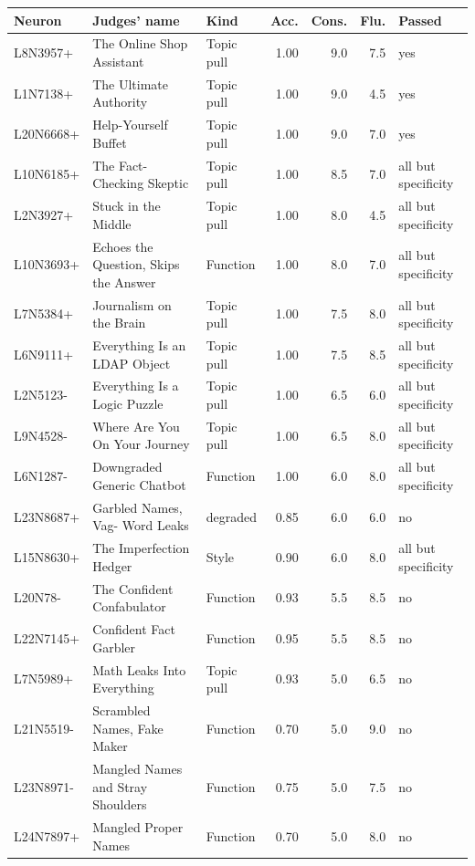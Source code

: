 {\scriptsize\begin{longtable}{@{}lL{3.4cm}L{1.8cm}rrrL{2.2cm}@{}}
\toprule Neuron & Judges' name & Kind & Acc. & Cons. & Flu. & Passed \\ \midrule \endhead
\bottomrule \endfoot
L8N3957+ & The Online Shop Assistant & Topic pull & 1.00 & 9.0 & 7.5 & yes \\
L1N7138+ & The Ultimate Authority & Topic pull & 1.00 & 9.0 & 4.5 & yes \\
L20N6668+ & Help-Yourself Buffet & Topic pull & 1.00 & 9.0 & 7.0 & yes \\
L10N6185+ & The Fact-Checking Skeptic & Topic pull & 1.00 & 8.5 & 7.0 & all but specificity \\
L2N3927+ & Stuck in the Middle & Topic pull & 1.00 & 8.0 & 4.5 & all but specificity \\
L10N3693+ & Echoes the Question, Skips the Answer & Function & 1.00 & 8.0 & 7.0 & all but specificity \\
L7N5384+ & Journalism on the Brain & Topic pull & 1.00 & 7.5 & 8.0 & all but specificity \\
L6N9111+ & Everything Is an LDAP Object & Topic pull & 1.00 & 7.5 & 8.5 & all but specificity \\
L2N5123- & Everything Is a Logic Puzzle & Topic pull & 1.00 & 6.5 & 6.0 & all but specificity \\
L9N4528- & Where Are You On Your Journey & Topic pull & 1.00 & 6.5 & 8.0 & all but specificity \\
L6N1287- & Downgraded Generic Chatbot & Function & 1.00 & 6.0 & 8.0 & all but specificity \\
L23N8687+ & Garbled Names, Vag- Word Leaks & degraded & 0.85 & 6.0 & 6.0 & no \\
L15N8630+ & The Imperfection Hedger & Style & 0.90 & 6.0 & 8.0 & all but specificity \\
L20N78- & The Confident Confabulator & Function & 0.93 & 5.5 & 8.5 & no \\
L22N7145+ & Confident Fact Garbler & Function & 0.95 & 5.5 & 8.5 & no \\
L7N5989+ & Math Leaks Into Everything & Topic pull & 0.93 & 5.0 & 6.5 & no \\
L21N5519- & Scrambled Names, Fake Maker & Function & 0.70 & 5.0 & 9.0 & no \\
L23N8971- & Mangled Names and Stray Shoulders & Function & 0.75 & 5.0 & 7.5 & no \\
L24N7897+ & Mangled Proper Names & Function & 0.70 & 5.0 & 8.0 & no \\

\end{longtable}}

